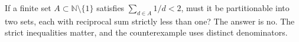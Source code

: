 If a finite set $A\subset\mathbb N\setminus\{1\}$ satisfies $\sum_{d\in A}1/d<2$, must it be partitionable into two sets, each with reciprocal sum strictly less than one? The answer is no. The strict inequalities matter, and the counterexample uses distinct denominators.

